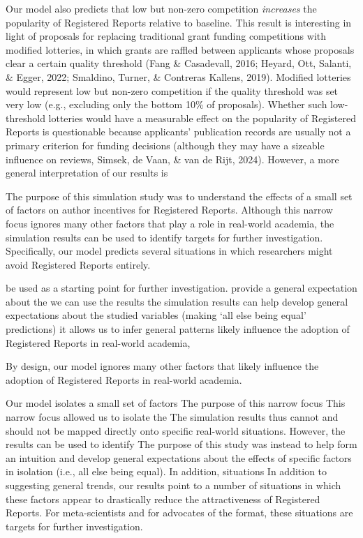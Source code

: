 \documentclass[
  ,man,mask,floatsintext]{apa6}
\begin{document}
Our model also predicts that low but non-zero competition \emph{increases} the popularity of Registered Reports relative to baseline.
This result is interesting in light of proposals for replacing traditional grant funding competitions with modified lotteries, in which grants are raffled between applicants whose proposals clear a certain quality threshold (Fang \& Casadevall, 2016; Heyard, Ott, Salanti, \& Egger, 2022; Smaldino, Turner, \& Contreras Kallens, 2019).
Modified lotteries would represent low but non-zero competition if the quality threshold was set very low (e.g., excluding only the bottom 10\% of proposals).
Whether such low-threshold lotteries would have a measurable effect on the popularity of Registered Reports is questionable because applicants' publication records are usually not a primary criterion for funding decisions (although they may have a sizeable influence on reviews, Simsek, de Vaan, \& van de Rijt, 2024).
However, a more general interpretation of our results is

The purpose of this simulation study was to understand the effects of a small set of factors on author incentives for Registered Reports.
Although this narrow focus ignores many other factors that play a role in real-world academia, the simulation results can be used to identify targets for further investigation.
Specifically, our model predicts several situations in which researchers might avoid Registered Reports entirely.

be used as a starting point for further investigation.
provide a general expectation about the
we can use the results
the simulation results can help develop general expectations about the studied variables (making `all else being equal' predictions)
it allows us to infer general patterns
likely influence the adoption of Registered Reports in real-world academia,

By design, our model ignores many other factors that likely influence the adoption of Registered Reports in real-world academia.

Our model isolates a small set of factors
The purpose of this narrow focus
This narrow focus allowed us to isolate the
The simulation results thus cannot and should not be mapped directly onto specific real-world situations.
However, the results can be used to identify
The purpose of this study was instead to help form an intuition and develop general expectations about the effects of specific factors in isolation (i.e., all else being equal).
In addition, situations
In addition to suggesting general trends, our results point to a number of situations in which these factors appear to drastically reduce the attractiveness of Registered Reports.
For meta-scientists and for advocates of the format, these situations are targets for further investigation.
\end{document}
